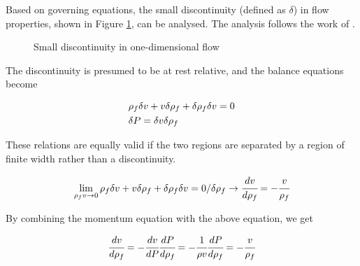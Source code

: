 \documentclass[../Article_Model_Parameters.tex]{subfiles}
\begin{document}
	Based on governing equations, the small discontinuity (defined as $\delta$) in flow properties, shown in Figure \ref{fig: Discontinuity_slow_flow}, can be analysed. The analysis follows the work of \citet{Schreier1982}.
	
	\begin{figure}[!h]
		\centering
		\caption{Small discontinuity in one-dimensional flow}
		\label{fig: Discontinuity_slow_flow}
	\end{figure} 
	
	The discontinuity is presumed to be at rest relative, and the balance equations become		
	
	{\footnotesize
		\begin{align*}
			&{\color{black}\rho_f} \delta v + v \delta {\color{black}\rho_f} + \delta {\color{black}\rho_f} \delta v = 0 \\
			&\delta {\color{black}P} = \delta v \delta {\color{black}\rho_f}
		\end{align*}
	}
	
	These relations are equally valid if the two regions are separated by a region of finite width rather than a discontinuity. 
	
	{\footnotesize
		\begin{equation*}
			\lim_{{\color{black}\rho_f} v \rightarrow 0} {\color{black}\rho_f} \delta v + v \delta {\color{black}\rho_f} + \delta {\color{black}\rho_f} \delta v = 0 / \delta {\color{black}\rho_f} \rightarrow \cfrac{d v}{d {\color{black}\rho_f}} = - \cfrac{v}{{\color{black}\rho_f}}
		\end{equation*}
	}
	
	By combining the momentum equation with the above equation, we get
	
	{\footnotesize
		\begin{equation} \label{EQ: Pressure_Velocity}
			\cfrac{d v}{d {\color{black}\rho_f}} = - \cfrac{d v}{d{\color{black}P}} \cfrac{d {\color{black}P}}{d {\color{black}\rho_f}} = -\cfrac{1}{\rho v} \cfrac{d{\color{black}P}}{d{\color{black}\rho_f}} = -\cfrac{v}{{\color{black}\rho_f}}
		\end{equation}
	}
	
\end{document}
